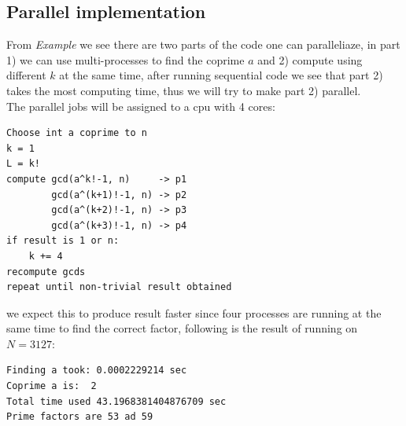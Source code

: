 \documentclass[10pt]{article}
\begin{document}
\subsection{Parallel implementation}
From \textit{Example} we see there are two parts of the code one can paralleliaze, in part 1) we can use multi-processes to find the coprime $a$ and 2) compute using different $k$ at the same time, after running sequential code we see that part 2) takes the most computing time, thus we will try to make part 2) parallel.\\
The parallel jobs will be assigned to a cpu with 4 cores:
\begin{verbatim}
Choose int a coprime to n
k = 1
L = k!
compute gcd(a^k!-1, n)     -> p1
        gcd(a^(k+1)!-1, n) -> p2
        gcd(a^(k+2)!-1, n) -> p3
        gcd(a^(k+3)!-1, n) -> p4
if result is 1 or n:
    k += 4
recompute gcds
repeat until non-trivial result obtained
\end{verbatim} 
we expect this to produce result faster since four processes are running at the same time to find the correct factor, following is the result of running on $N=3127$:
\begin{verbatim}
Finding a took: 0.0002229214 sec
Coprime a is:  2
Total time used 43.1968381404876709 sec
Prime factors are 53 ad 59
\end{verbatim}
\end{document}
